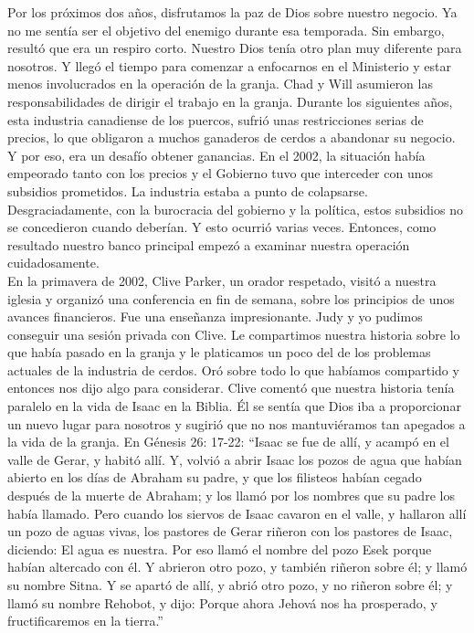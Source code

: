\documentclass[twoside, 12pt]{book}
\begin{document}
Por los próximos dos años, disfrutamos la paz de Dios sobre nuestro negocio. Ya no me sentía ser el objetivo del enemigo durante esa temporada. Sin embargo, resultó que era un respiro corto. Nuestro Dios tenía otro plan muy diferente para nosotros. Y llegó el tiempo para comenzar a enfocarnos en el Ministerio y estar menos involucrados en la operación de la granja. Chad y Will asumieron las responsabilidades de dirigir el trabajo en la granja. Durante los siguientes años, esta industria canadiense de los puercos, sufrió unas restricciones serias de precios, lo que obligaron a muchos ganaderos de cerdos a abandonar su negocio. Y por eso, era un desafío obtener ganancias.  En el 2002, la situación había empeorado tanto con los precios y el Gobierno tuvo que interceder con unos subsidios prometidos. La industria estaba a punto de colapsarse.  Desgraciadamente, con la burocracia del gobierno y la política, estos subsidios no se concedieron cuando deberían. Y esto ocurrió varias veces. Entonces, como resultado nuestro banco principal empezó a examinar nuestra operación cuidadosamente.\\

En la primavera de 2002, Clive Parker, un orador respetado, visitó a nuestra iglesia y organizó una conferencia en fin de semana, sobre los principios de unos avances financieros. Fue una enseñanza impresionante. Judy y yo pudimos conseguir una sesión privada con Clive. Le compartimos nuestra historia sobre lo que había pasado en la granja y le platicamos un poco del de los problemas actuales de la industria de cerdos. Oró sobre todo lo que habíamos compartido y entonces nos dijo algo para considerar. Clive comentó que nuestra historia tenía paralelo en la vida de Isaac en la Biblia. Él se sentía que Dios iba a proporcionar un nuevo lugar para nosotros y sugirió que no nos mantuviéramos tan apegados a la vida de la granja. En Génesis 26: 17-22:  “Isaac se fue de allí, y acampó en el valle de Gerar, y habitó allí.  Y, volvió a abrir Isaac los pozos de agua que habían abierto en los días de Abraham su padre, y que los filisteos habían cegado después de la muerte de Abraham; y los llamó por los nombres que su padre los había llamado. Pero cuando los siervos de Isaac cavaron en el valle, y hallaron allí un pozo de aguas vivas, los pastores de Gerar riñeron con los pastores de Isaac, diciendo: El agua es nuestra. Por eso llamó el nombre del pozo Esek porque habían altercado con él.  Y abrieron otro pozo, y también riñeron sobre él; y llamó su nombre Sitna. Y se apartó de allí, y abrió otro pozo, y no riñeron sobre él; y llamó su nombre Rehobot, y dijo: Porque ahora Jehová nos ha prosperado, y fructificaremos en la tierra.”\\
\end{document}
